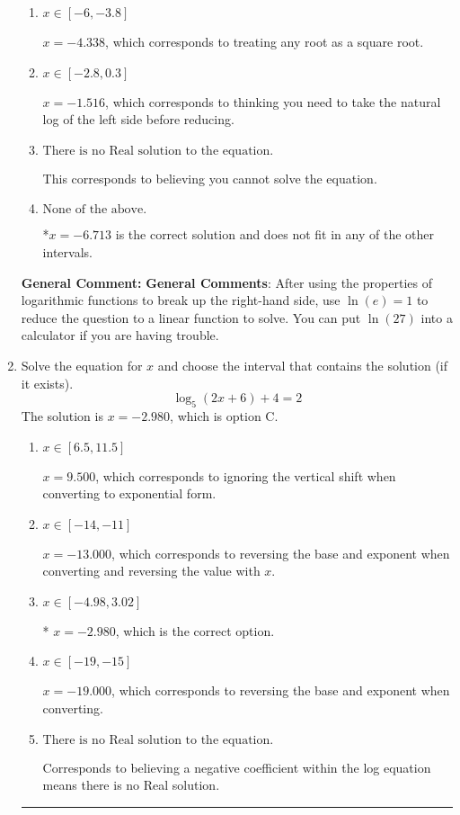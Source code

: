 \documentclass{extbook}[14pt]
\newcommand{\litem}[1]{\item #1

\rule{\textwidth}{0.4pt}}
\begin{document}
\begin{enumerate}
{\begin{enumerate}[label=\Alph*.]
$x = 6.713$, which is the negative of the correct solution.
\item \( x \in [-6, -3.8] \)

$x = -4.338$, which corresponds to treating any root as a square root.
\item \( x \in [-2.8, 0.3] \)

$x = -1.516$, which corresponds to thinking you need to take the natural log of the left side before reducing.
\item \( \text{There is no Real solution to the equation.} \)

This corresponds to believing you cannot solve the equation.
\item \( \text{None of the above.} \)

*$x = -6.713$ is the correct solution and does not fit in any of the other intervals.
\end{enumerate}

\textbf{General Comment:} \textbf{General Comments}: After using the properties of logarithmic functions to break up the right-hand side, use $\ln(e) = 1$ to reduce the question to a linear function to solve. You can put $\ln(27)$ into a calculator if you are having trouble.
}
\litem{
Solve the equation for $x$ and choose the interval that contains the solution (if it exists).
\[ \log_{5}{(2x+6)}+4 = 2 \]The solution is \( x = -2.980 \), which is option C.\begin{enumerate}[label=\Alph*.]
\item \( x \in [6.5, 11.5] \)

$x = 9.500$, which corresponds to ignoring the vertical shift when converting to exponential form.
\item \( x \in [-14, -11] \)

$x = -13.000$, which corresponds to reversing the base and exponent when converting and reversing the value with $x$.
\item \( x \in [-4.98, 3.02] \)

* $x = -2.980$, which is the correct option.
\item \( x \in [-19, -15] \)

$x = -19.000$, which corresponds to reversing the base and exponent when converting.
\item \( \text{There is no Real solution to the equation.} \)

Corresponds to believing a negative coefficient within the log equation means there is no Real solution.
\end{enumerate}

}
\end{enumerate}
\end{document}
